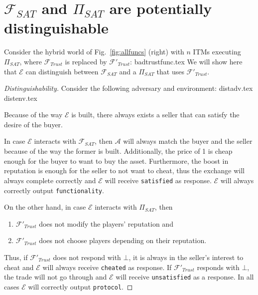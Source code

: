 \section{$\mathcal{F}_{SAT}$ and $\Pi_{SAT}$ are potentially distinguishable}
  Consider the hybrid world of Fig.~\ref{fig:allfuncs} (right) with $n$ ITMs executing
  $\Pi_{SAT}$, where $\mathcal{F}_{Trust}$ is replaced by $\mathcal{F}'_{Trust}$:
  {badtrustfunc.tex}
  We will show here that $\mathcal{E}$ can distinguish between $\mathcal{F}_{SAT}$ and a
  $\Pi_{SAT}$ that uses $\mathcal{F}'_{Trust}$.
  \begin{proof}[Distinguishability]
    Consider the following adversary and environment:
    {distadv.tex}
    {distenv.tex}

    Because of the way $\mathcal{E}$ is built, there always exists a seller that can
    satisfy the desire of the buyer.

    In case $\mathcal{E}$ interacts with $\mathcal{F}_{SAT}$, then $\mathcal{A}$ will
    always match the buyer and the seller because of the way the former is built.
    Additionally, the price of 1 is cheap enough for the buyer to want to buy the asset.
    Furthermore, the boost in reputation is enough for the seller to not want to cheat,
    thus the exchange will always complete correctly and $\mathcal{E}$ will receive
    \texttt{satisfied} as response. $\mathcal{E}$ will always correctly output
    \texttt{functionality}.

    On the other hand, in case $\mathcal{E}$ interacts with $\Pi_{SAT}$, then
    \begin{enumerate}
      \item $\mathcal{F}'_{Trust}$ does not modify the players' reputation and
      \item $\mathcal{F}'_{Trust}$ does not choose players depending on their reputation.
    \end{enumerate}
    Thus, if $\mathcal{F}'_{Trust}$ does not respond with $\bot$, it is always in the
    seller's interest to cheat and $\mathcal{E}$ will always receive \texttt{cheated} as
    response. If $\mathcal{F}'_{Trust}$ responds with $\bot$, the trade will not go
    through and $\mathcal{E}$ will receive \texttt{unsatisfied} as a response. In all
    cases $\mathcal{E}$ will correctly output \texttt{protocol}.
  \end{proof}

